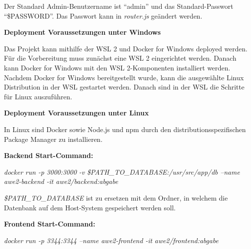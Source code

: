 Der Standard Admin-Benutzername ist \enquote{admin} und das Standard-Passwort \enquote{\$PASSWORD}. Das Passwort kann in \textit{router.js} geändert werden.

\textbf{Deployment Voraussetzungen unter Windows}

Das Projekt kann mithilfe der WSL 2 und Docker for Windows deployed werden.
Für die Vorbereitung muss zunächst eine WSL 2 eingerichtet werden.
Danach kann Docker for Windows mit den WSL 2-Komponenten installiert werden.
Nachdem Docker for Windows bereitgestellt wurde, kann die ausgewählte Linux Distribution in der WSL gestartet werden.
Danach sind in der WSL die Schritte für Linux auszuführen.

\textbf{Deployment Voraussetzungen unter Linux}

In Linux sind Docker sowie Node.js und npm durch den distributionsspezifischen Package Manager zu installieren.

\textbf{Backend Start-Command:}

\textit{docker run -p 3000:3000 -v \$PATH\_TO\_DATABASE:/usr/src/app/db --name awe2-backend -it awe2/backend:abgabe}

\textit{\$PATH\_TO\_DATABASE} ist zu ersetzen mit dem Ordner, in welchem die Datenbank auf dem Host-System gespeichert werden soll.

\textbf{Frontend Start-Command:}

\textit{docker run -p 3344:3344 --name awe2-frontend -it awe2/frontend:abgabe}
